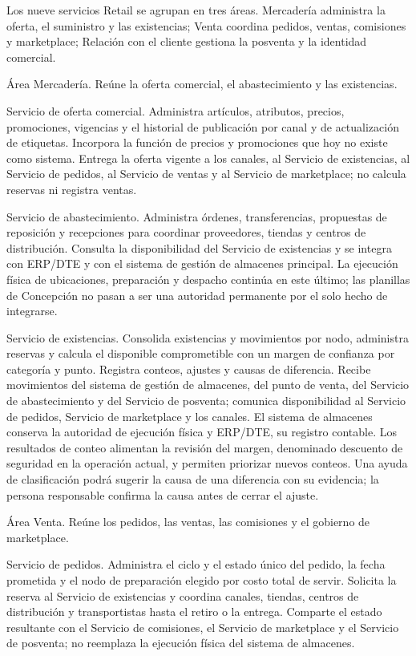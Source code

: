 \documentclass[11pt]{article}
\begin{document}
{Los nueve servicios Retail se agrupan en tres áreas. Mercadería administra la oferta, el suministro y las existencias; Venta coordina pedidos, ventas, comisiones y marketplace; Relación con el cliente gestiona la posventa y la identidad comercial.}

{Área Mercadería. Reúne la oferta comercial, el abastecimiento y las existencias.}

{Servicio de oferta comercial. Administra artículos, atributos, precios, promociones, vigencias y el historial de publicación por canal y de actualización de etiquetas. Incorpora la función de precios y promociones que hoy no existe como sistema. Entrega la oferta vigente a los canales, al Servicio de existencias, al Servicio de pedidos, al Servicio de ventas y al Servicio de marketplace; no calcula reservas ni registra ventas.}

{Servicio de abastecimiento. Administra órdenes, transferencias, propuestas de reposición y recepciones para coordinar proveedores, tiendas y centros de distribución. Consulta la disponibilidad del Servicio de existencias y se integra con ERP/DTE y con el sistema de gestión de almacenes principal. La ejecución física de ubicaciones, preparación y despacho continúa en este último; las planillas de Concepción no pasan a ser una autoridad permanente por el solo hecho de integrarse.}

{Servicio de existencias. Consolida existencias y movimientos por nodo, administra reservas y calcula el disponible comprometible con un margen de confianza por categoría y punto. Registra conteos, ajustes y causas de diferencia. Recibe movimientos del sistema de gestión de almacenes, del punto de venta, del Servicio de abastecimiento y del Servicio de posventa; comunica disponibilidad al Servicio de pedidos, Servicio de marketplace y los canales. El sistema de almacenes conserva la autoridad de ejecución física y ERP/DTE, su registro contable. Los resultados de conteo alimentan la revisión del margen, denominado descuento de seguridad en la operación actual, y permiten priorizar nuevos conteos. Una ayuda de clasificación podrá sugerir la causa de una diferencia con su evidencia; la persona responsable confirma la causa antes de cerrar el ajuste.}

{Área Venta. Reúne los pedidos, las ventas, las comisiones y el gobierno de marketplace.}

{Servicio de pedidos. Administra el ciclo y el estado único del pedido, la fecha prometida y el nodo de preparación elegido por costo total de servir. Solicita la reserva al Servicio de existencias y coordina canales, tiendas, centros de distribución y transportistas hasta el retiro o la entrega. Comparte el estado resultante con el Servicio de comisiones, el Servicio de marketplace y el Servicio de posventa; no reemplaza la ejecución física del sistema de almacenes.}
\end{document}

